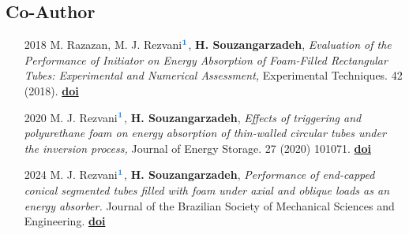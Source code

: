 \documentclass[
	a4paper,
]{ThirtyNinesecondscv}
\begin{document}
\subsection{Co-Author}
\begin{itemize}
  \item[2018] M. Razazan, M. J. Rezvani$ ^{\textcolor[rgb]{0.00,0.50,1.00}{\textbf{1}}} $, \textbf{H. Souzangarzadeh}, \textit{Evaluation of the Performance of Initiator on Energy Absorption of Foam-Filled Rectangular Tubes: Experimental and Numerical Assessment,} Experimental Techniques. 42 (2018). {\href{https://doi.org/10.1007/s40799-017-0206-1}	{{\selectfont			\textcolor[rgb]{0.00,0.00,0.55}{\textbf{doi}}}}} 

\item[2020] M. J. Rezvani$ ^{\textcolor[rgb]{0.00,0.50,1.00}{\textbf{1}}} $, \textbf{H. Souzangarzadeh}, \textit{Effects of triggering and polyurethane foam on energy absorption of thin-walled circular tubes under the inversion process,} Journal of Energy Storage. 27 (2020) 101071. 	\href{https://doi.org/10.1016/j.est.2019.101071}{{\selectfont		\textcolor[rgb]{0.00,0.00,0.55}{\textbf{doi}}}} %
		
  \item[2024] M. J. Rezvani$ ^{\textcolor[rgb]{0.00,0.50,1.00}{\textbf{1}}} $, \textbf{H. Souzangarzadeh},  \textit{Performance of end-capped conical segmented tubes filled with foam under axial and oblique loads as an energy absorber. } {\footnotesize Journal of the Brazilian Society of Mechanical Sciences and Engineering.}
  	\href{https://doi.org/10.1007/s40430-023-04581-4}
  {{\selectfont
  		\textcolor[rgb]{0.00,0.00,0.55}{\textbf{doi}}}}


\end{itemize}

\end{document}
